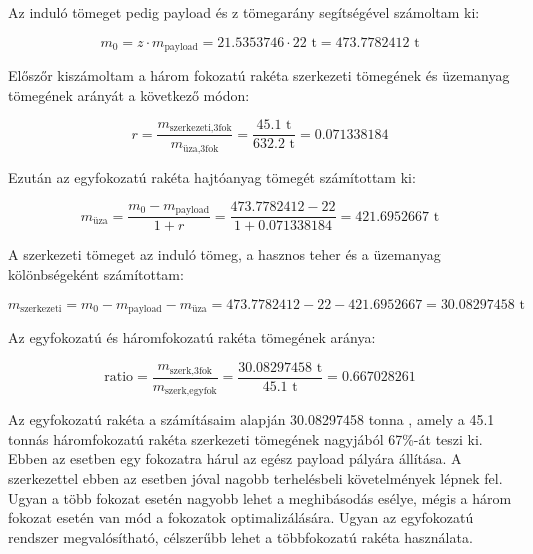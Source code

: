 \documentclass[a4paper,12pt]{article}
\begin{document}
Az induló tömeget pedig payload és z tömegarány segítségével számoltam ki:

\[
m_0 = z \cdot m_{\text{payload}} = 21.5353746 \cdot 22 \text{ t} = 473.7782412 \text{ t}
\]

Előszőr kiszámoltam a három fokozatú rakéta szerkezeti tömegének és üzemanyag tömegének arányát a következő módon:

\[
r = \frac{m_{\text{szerkezeti,3fok}}}{m_{\text{üza,3fok}}} = \frac{45.1 \text{ t}}{632.2 \text{ t}} = 0.071338184
\]

Ezután az egyfokozatú rakéta hajtóanyag tömegét számítottam ki:

\[
m_{\text{üza}} = \frac{m_0 - m_{\text{payload}}}{1 + r} = \frac{473.7782412 - 22}{1 + 0.071338184} = 421.6952667 \text{ t}
\]


A szerkezeti tömeget az induló tömeg, a hasznos teher és a üzemanyag kölönbségeként számítottam:

\[
m_{\text{szerkezeti}} = m_0 - m_{\text{payload}} - m_{\text{üza}} = 473.7782412 - 22 - 421.6952667 = 30.08297458 \text{ t}
\]

Az egyfokozatú és háromfokozatú rakéta tömegének aránya:

\[
\text{ratio} = \frac{m_{\text{szerk,3fok}}}{m_{\text{szerk,egyfok}}} =  \frac{30.08297458 \text{ t}}{45.1\text{ t}} = 0.667028261
\] 

Az egyfokozatú rakéta a számításaim alapján 30.08297458 tonna , amely a 45.1 tonnás háromfokozatú rakéta szerkezeti tömegének nagyjából 67\%-át teszi ki.
Ebben az esetben egy fokozatra hárul az egész payload pályára állítása. A szerkezettel ebben az esetben jóval nagobb terhelésbeli követelmények lépnek fel.
Ugyan a több fokozat esetén nagyobb lehet a meghibásodás esélye, mégis a három fokozat esetén van mód a fokozatok optimalizálására. Ugyan az egyfokozatú rendszer megvalósítható, célszerűbb lehet a többfokozatú rakéta használata.  
\end{document}
